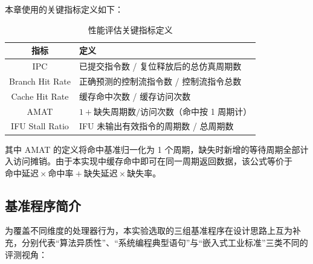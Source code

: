 本章使用的关键指标定义如下：

\begin{table}[H]
  \centering
  \caption{性能评估关键指标定义}
  \label{tbl:perf-metrics}
  \begin{tabular}{cl}
    \toprule
    指标 & 定义 \\
    \midrule
    IPC & 已提交指令数 / 复位释放后的总仿真周期数 \\
    Branch Hit Rate & 正确预测的控制流指令数 / 控制流指令总数 \\
    Cache Hit Rate & 缓存命中次数 / 缓存访问次数 \\
    AMAT & $1 + \text{缺失周期数}/\text{访问次数}$（命中按 1 周期计） \\
    IFU Stall Ratio & IFU 未输出有效指令的周期数 / 总周期数 \\
    \bottomrule
  \end{tabular}
\end{table}

其中 AMAT 的定义将命中基准归一化为 1 个周期，缺失时新增的等待周期全部计入访问摊销。由于本实现中缓存命中即可在同一周期返回数据，该公式等价于 $\text{命中延迟} \times \text{命中率} + \text{缺失延迟} \times \text{缺失率}$。

\subsection{基准程序简介}

为覆盖不同维度的处理器行为，本实验选取的三组基准程序在设计思路上互为补充，分别代表“算法异质性”、“系统编程典型语句”与“嵌入式工业标准”三类不同的评测视角：

